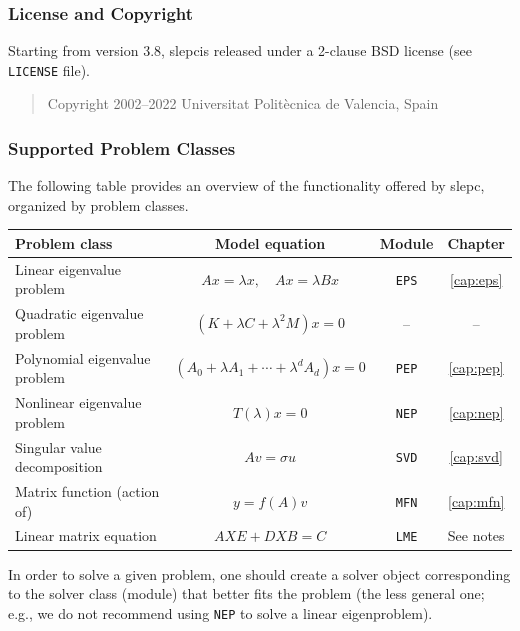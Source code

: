 \documentclass[titlepage,10pt,a4paper]{book}
\newcommand{\packnoi}[1]{{\sc #1}\xspace}
\newcommand{\slepc}{\texorpdfstring{\packnoi{slep\rm c}}{{SLEPc}}}
\begin{document}
{\subsubsection*{License and Copyright}

Starting from version 3.8, \slepc is released under a 2-clause BSD license (see \texttt{LICENSE} file).

\begin{quote}
\begin{sffamily}
Copyright 2002--2022 Universitat Polit\`ecnica de Valencia, Spain
\end{sffamily}
\end{quote}

\newpage
\subsubsection*{Supported Problem Classes}

The following table provides an overview of the functionality offered by \slepc, organized by problem classes.

\begin{table}[h]
\label{tab:modules}
\centering
{\small \begin{tabular}{lccc}
Problem class                 & Model equation  & Module       & Chapter \\\hline
Linear eigenvalue problem     & $Ax=\lambda x,\quad Ax=\lambda Bx$ & \texttt{EPS} & \ref{cap:eps} \\
Quadratic eigenvalue problem  & $(K+\lambda C+\lambda^2M)x=0$ & -- & -- \\
Polynomial eigenvalue problem & $(A_0+\lambda A_1+\cdots+\lambda^dA_d)x=0$ & \texttt{PEP} & \ref{cap:pep} \\
Nonlinear eigenvalue problem  & $T(\lambda)x=0$ & \texttt{NEP} & \ref{cap:nep} \\\hline
Singular value decomposition  & $Av=\sigma u$   & \texttt{SVD} & \ref{cap:svd} \\
Matrix function (action of)   & $y=f(A)v$   & \texttt{MFN} & \ref{cap:mfn} \\
Linear matrix equation        & $AXE+DXB=C$   & \texttt{LME} & See notes \\\hline
\end{tabular} }
\end{table}

\noindent In order to solve a given problem, one should create a solver object corresponding to the solver class (module) that better fits the problem (the less general one; e.g., we do not recommend using \texttt{NEP} to solve a linear eigenproblem).\\[3mm]

}
\end{document}
